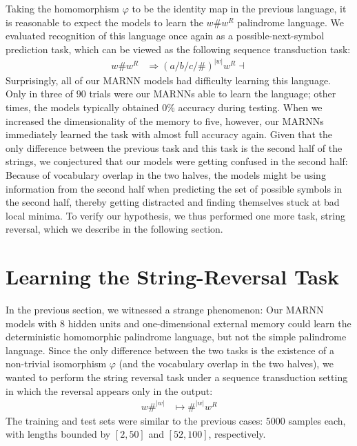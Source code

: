 \documentclass[11pt,a4paper]{article}
\theoremstyle{plain}
\begin{document}
Taking the homomorphism $\varphi$ to be the identity map in the previous language, it is reasonable to expect the models to learn the $w\# w^R$ palindrome language. We evaluated recognition of this language once again as a possible-next-symbol prediction task, which can be viewed as the following sequence transduction task:
\vspace{-0.4em}
\begin{align*}
    w\# w^R &\Rightarrow (a/b/c/\#)^{|w|} w^{R}\dashv
\end{align*}
Surprisingly, all of our MARNN models had difficulty learning this language. Only in three of $90$ trials were our MARNNs able to learn the language; other times, the models typically obtained $0\%$ accuracy during testing. When we increased the dimensionality of the memory to five, however, our MARNNs immediately learned the task with almost full accuracy again. Given that the only difference between the previous task and this task is the second half of the strings, we conjectured that our models were getting confused in the second half: Because of vocabulary overlap in the two halves, the models might be using information from the second half when predicting the set of possible symbols in the second half, thereby getting distracted and finding themselves stuck at bad local minima. To verify our hypothesis, we thus performed one more task, string reversal, which we describe in the following section.


\vspace{-0.5em}
\section{Learning the String-Reversal Task}
In the previous section, we witnessed a strange phenomenon: Our MARNN models with $8$ hidden units and one-dimensional external memory could learn the deterministic homomorphic palindrome language, but not the simple palindrome language. Since the only difference between the two tasks is the existence of a non-trivial isomorphism $\varphi$ (and the vocabulary overlap in the two halves), we wanted to perform the string reversal task under a sequence transduction setting in which the reversal appears only in the output:
\begin{align*}
   w\#^{|w|} &\mapsto \#^{|w|} w^{R}
\end{align*}
The training and test sets were similar to the previous cases: $5000$ samples each, with lengths bounded by $[2,50]$ and $[52, 100]$, respectively.
\end{document}
